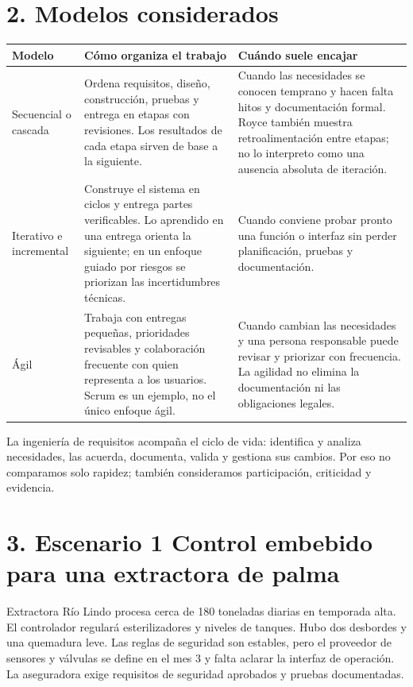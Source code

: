 \documentclass[10pt,letterpaper]{article}
\newcommand{\separa}{\hspace{0.25em}\raisebox{0.25ex}{\rule{0.38ex}{0.38ex}}\hspace{0.25em}}
\newcommand{\titulo}[1]{\section*{\textcolor{verde}{#1}}}
\begin{document}
\par
\titulo{2. Modelos considerados}
\par
\small
\par
\begin{tabularx}{\linewidth}{@{}p{2.7cm}Y Y@{}}
\color{white}\textbf{Modelo}&\color{white}\textbf{Cómo organiza el trabajo}&\color{white}\textbf{Cuándo suele encajar}\\\midrule
Secuencial o cascada&Ordena requisitos, diseño, construcción, pruebas y entrega en etapas con revisiones. Los resultados de cada etapa sirven de base a la siguiente.&Cuando las necesidades se conocen temprano y hacen falta hitos y documentación formal. Royce también muestra retroalimentación entre etapas; no lo interpreto como una ausencia absoluta de iteración.\\
Iterativo e incremental&Construye el sistema en ciclos y entrega partes verificables. Lo aprendido en una entrega orienta la siguiente; en un enfoque guiado por riesgos se priorizan las incertidumbres técnicas.&Cuando conviene probar pronto una función o interfaz sin perder planificación, pruebas y documentación.\\
Ágil&Trabaja con entregas pequeñas, prioridades revisables y colaboración frecuente con quien representa a los usuarios. Scrum es un ejemplo, no el único enfoque ágil.&Cuando cambian las necesidades y una persona responsable puede revisar y priorizar con frecuencia. La agilidad no elimina la documentación ni las obligaciones legales.\\
\end{tabularx}
\par
\normalsize
\par
La ingeniería de requisitos acompaña el ciclo de vida: identifica y analiza necesidades, las acuerda, documenta, valida y gestiona sus cambios. Por eso no comparamos solo rapidez; también consideramos participación, criticidad y evidencia.
\par
\titulo{3. Escenario 1 \separa Control embebido para una extractora de palma}
\par
Extractora Río Lindo procesa cerca de 180 toneladas diarias en temporada alta. El controlador regulará esterilizadores y niveles de tanques. Hubo dos desbordes y una quemadura leve. Las reglas de seguridad son estables, pero el proveedor de sensores y válvulas se define en el mes 3 y falta aclarar la interfaz de operación. La aseguradora exige requisitos de seguridad aprobados y pruebas documentadas.
\par
\end{document}
